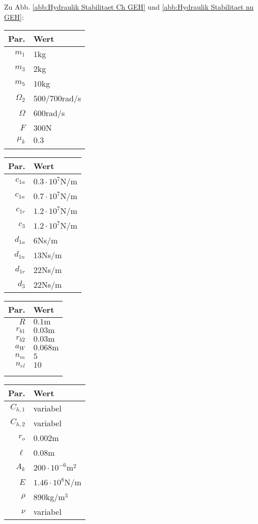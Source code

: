 Zu Abb. \ref{abb:Hydraulik Stabilitaet Ch GEH} und \ref{abb:Hydraulik Stabilitaet nu GEH}:
\begin{center}
\begin{tabular}{r|l}
Par. &Wert\\\hline
$m_1$&$1$kg\\
$m_3$& $2$kg\\
$m_5$&$10$kg\\
$\Omega_2$&$500$/$700$rad/s\\
$\Omega$&$600$rad/s\\
$F$&$300$N\\
$\mu_k$& $0.3$\\
&\\
\end{tabular} \hfill
\begin{tabular}{r|l}
Par. &Wert\\\hline
$c_{1a}$&$0.3\cdot10^{7}$N/m\\
$c_{1n}$&$0.7\cdot10^{7}$N/m \\
$c_{1r}$ & $1.2\cdot10^{7}$N/m\\
$c_{3}$& $1.2\cdot10^{7}$N/m\\
$d_{1a}$&$6$Ns/m\\
$d_{1n}$&$13$Ns/m \\
$d_{1r}$ &$22$Ns/m\\
$d_{3}$ & $22$Ns/m\\
\end{tabular}\hfill
\begin{tabular}{r|l}
Par. &Wert\\\hline
$R$&$0.1\textrm{m}$ \\
$r_{b1}$&$0.03\textrm{m}$\\
$r_{b2}$&$0.03\textrm{m}$\\
$a_{W}$&$ 0.068\textrm{m}$\\
$n_m$&$5$\\
$n_{el}$&$10$\\
&\\
&
\end{tabular} \hfill
\begin{tabular}{r|l}
Par. &Wert\\\hline
$C_{h,1}$&variabel\\
$C_{h,2}$&variabel\\
$r_o$&$0.002$m\\
$\ell$&$0.08$m\\
$A_k$&$200\cdot10^{-6}$m$^2$\\
$E$&$1.46\cdot10^{8}$N/m\\
$\rho$&$890$kg/m$^3$\\
$\nu$&variabel\\
\end{tabular}
\end{center}

